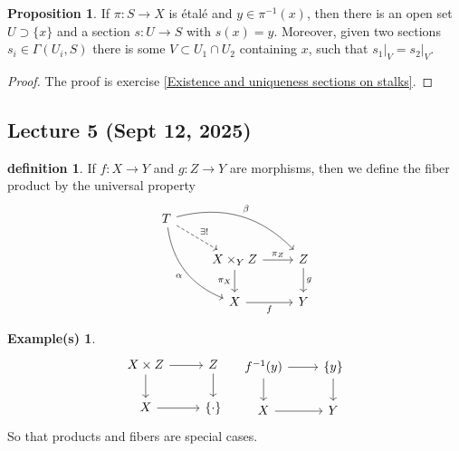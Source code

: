 \documentclass[10.5pt]{article}
\theoremstyle{definition}
\newtheorem{proposition}{Proposition}
\newtheorem{definition}{definition}
\newtheorem*{example}{Example(s)}
\newcommand{\set}[1]{\{#1\}}
\begin{document}
    \begin{proposition}
        If \(\pi:S \to X\) is \'etal\'e and \(y \in \pi^{-1}(x)\), then there is an open set \(U \supset \set{x}\) and a section \(s:U \to S\) with \(s(x) = y\). Moreover, given two sections \(s_i \in \Gamma(U_i,S)\) there is some \(V \subset U_1\cap U_2\) containing \(x\), such that \(s_1\vert_V = s_2\vert_V\).
    \end{proposition}
    \begin{proof}
        The proof is exercise \ref{Existence and uniqueness sections on stalks}.
    \end{proof}


    \subsection{Lecture 5 (Sept 12, 2025)}

    \begin{definition}
        If \(f: X \to Y\) and \(g: Z \to Y\) are morphisms, then we define the fiber product by the universal property
        \begin{equation*}
            \begin{tikzcd}
                T
                \arrow[bend left]{drr}{\beta}
                \arrow[bend right,swap]{ddr}{\alpha}
                \arrow[dashed]{dr}{\exists !} & & \\
                & X \times_Y Z \arrow{r}{\pi_Z} \arrow{d}[swap]{\pi_X}
                & Z \arrow{d}{g} \\
                & X \arrow[swap]{r}{f}
                & Y
            \end{tikzcd}
        \end{equation*}
    \end{definition}
    \begin{example}
        \begin{equation*}
            \begin{tikzcd}
                X \times Z \arrow[r] \arrow[d] &Z \arrow[d] \\ X \arrow[r] & \set{\cdot}
            \end{tikzcd} \quad
            \begin{tikzcd}
                f^{-1}(y) \arrow[r] \arrow[d] &\set{y} \arrow[d] \\ X \arrow[r] & Y
            \end{tikzcd}
        \end{equation*}
        So that products and fibers are special cases.
    \end{example}
\end{document}
